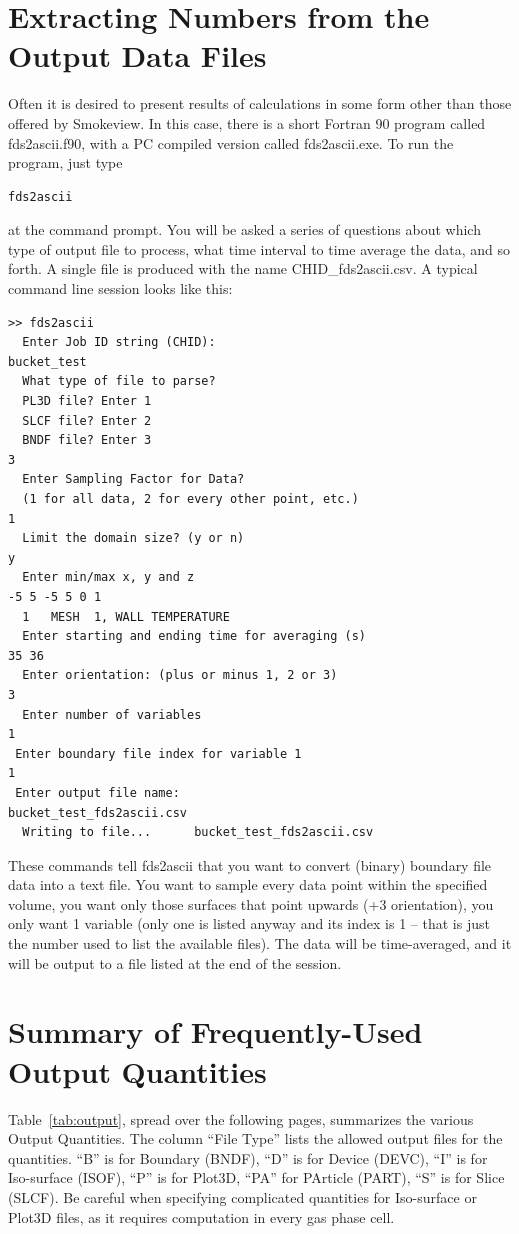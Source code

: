 \documentclass[11pt]{book}
\begin{document}
\section{Extracting Numbers from the Output Data Files}
\label{info:fds2ascii}

Often it is desired to present results of calculations in some form other
than those offered by Smokeview. In this case, there is a short
Fortran 90 program called {\ct fds2ascii.f90}, with a PC compiled version
called {\ct fds2ascii.exe}. To run the program, just type
\begin{lstlisting}
fds2ascii
\end{lstlisting}
at the command prompt. You will be asked a series of questions
about which type of output file to process, what time interval to
time average the data, and so forth. A single file is produced
with the name {\ct CHID\_fds2ascii.csv}. A typical command line session looks like this:

\begin{lstlisting}
>> fds2ascii
  Enter Job ID string (CHID):
bucket_test
  What type of file to parse?
  PL3D file? Enter 1
  SLCF file? Enter 2
  BNDF file? Enter 3
3
  Enter Sampling Factor for Data?
  (1 for all data, 2 for every other point, etc.)
1
  Limit the domain size? (y or n)
y
  Enter min/max x, y and z
-5 5 -5 5 0 1
  1   MESH  1, WALL TEMPERATURE
  Enter starting and ending time for averaging (s)
35 36
  Enter orientation: (plus or minus 1, 2 or 3)
3
  Enter number of variables
1
 Enter boundary file index for variable 1
1
 Enter output file name:
bucket_test_fds2ascii.csv
  Writing to file...      bucket_test_fds2ascii.csv
\end{lstlisting}
 \noindent
These commands tell {\ct fds2ascii} that you want to convert (binary)
boundary file data into a text file. You want to sample
every data point within the specified volume, you want only those surfaces that point
upwards (+3 orientation), you only want 1 variable (only one is listed anyway and its index is
1 -- that is just the number used to list the available files). The data will be time-averaged, and it will
be output to a file listed at the end of the session.




\section{Summary of Frequently-Used Output Quantities}
\label{info:outputquantities}

Table~\ref{tab:output}, spread over the following pages, summarizes the various Output Quantities.
The column ``File Type'' lists the allowed output files for the quantities. ``B'' is for Boundary ({\ct BNDF}),
``D'' is for Device ({\ct DEVC}), ``I'' is for Iso-surface ({\ct ISOF}), ``P'' is for Plot3D, ``PA'' for PArticle ({\ct PART}),
``S'' is for Slice ({\ct SLCF}). Be careful
when specifying complicated quantities for Iso-surface or Plot3D files, as it requires computation in every gas phase cell.
\end{document}
